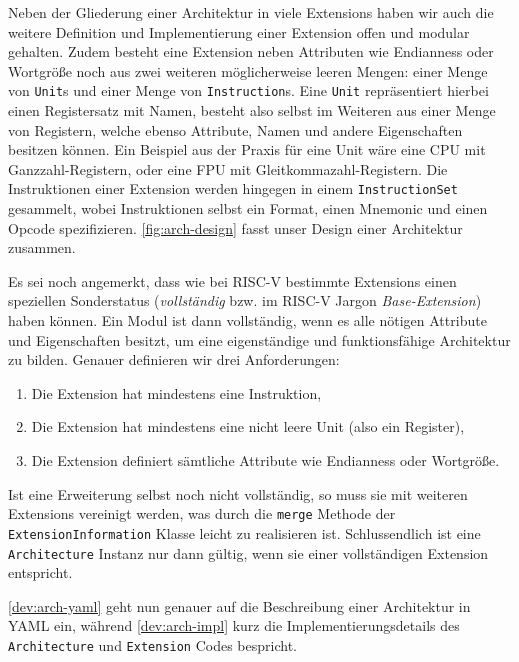 Neben der Gliederung einer Architektur in viele Extensions haben wir auch die
weitere Definition und Implementierung einer Extension offen und modular
gehalten. Zudem besteht eine Extension neben Attributen wie Endianness oder
Wortgröße noch aus zwei weiteren möglicherweise leeren Mengen: einer Menge von
\texttt{Unit}s und einer Menge von \texttt{Instruction}s. Eine \texttt{Unit}
repräsentiert hierbei einen Registersatz mit Namen, besteht also selbst im
Weiteren aus einer Menge von Registern, welche ebenso Attribute, Namen und
andere Eigenschaften besitzen können. Ein Beispiel aus der Praxis für eine Unit wäre eine CPU
mit Ganzzahl-Registern, oder eine FPU mit Gleitkommazahl-Registern.
Die Instruktionen einer Extension werden hingegen in einem
\texttt{InstructionSet} gesammelt, wobei Instruktionen selbst ein Format, einen
Mnemonic und einen Opcode spezifizieren. \autoref{fig:arch-design} fasst unser
Design einer Architektur zusammen.

Es sei noch angemerkt, dass wie bei RISC-V bestimmte Extensions einen speziellen
Sonderstatus (\emph{vollständig} bzw. im RISC-V Jargon
\emph{Base-Extension}) haben können. Ein Modul ist dann vollständig, wenn es alle
nötigen Attribute und Eigenschaften besitzt, um eine eigenständige und
funktionsfähige Architektur zu bilden. Genauer definieren wir drei Anforderungen:
\begin{enumerate}
  \item Die Extension hat mindestens eine Instruktion,
  \item Die Extension hat mindestens eine nicht leere Unit (also ein Register),
  \item Die Extension definiert sämtliche Attribute wie Endianness oder Wortgröße.
\end{enumerate}

Ist eine Erweiterung selbst noch nicht vollständig, so muss sie mit weiteren 
Extensions vereinigt werden, was durch die \texttt{merge}
Methode der \texttt{ExtensionInformation} Klasse leicht zu realisieren ist.
Schlussendlich ist eine \texttt{Architecture} Instanz nur dann gültig, wenn sie
einer vollständigen Extension entspricht.

\autoref{dev:arch-yaml} geht nun genauer auf die Beschreibung einer Architektur
in YAML ein, während \autoref{dev:arch-impl} kurz die Implementierungsdetails
des \texttt{Architecture} und \texttt{Extension} Codes bespricht.
